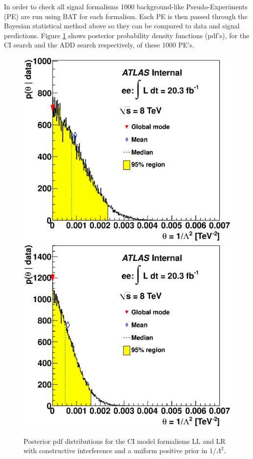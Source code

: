     In order to check all signal formalisms 1000 background-like Pseudo-Experiments (PE) are run using BAT for each formalism. Each PE is then passed through the Bayesian statistical method above so they can be compared to data and signal predictions. Figure \ref{fig:pdf_CI_main} shows posterior probability density functions (pdf's), for the CI search and the ADD search respectively, of these 1000 PE's.

    \begin{figure}[h]
        \begin{center}
            \includegraphics[width=0.49\linewidth]{images/post_LL_minus.eps}
            \includegraphics[width=0.49\linewidth]{images/post_LR_minus.eps}
        \end{center}
       \caption{Posterior pdf distributions for the CI model formalisms LL and LR with constructive interference and a uniform positive prior in $1/\Lambda^{2}$.}
       \label{fig:pdf_CI_main}
    \end{figure}




